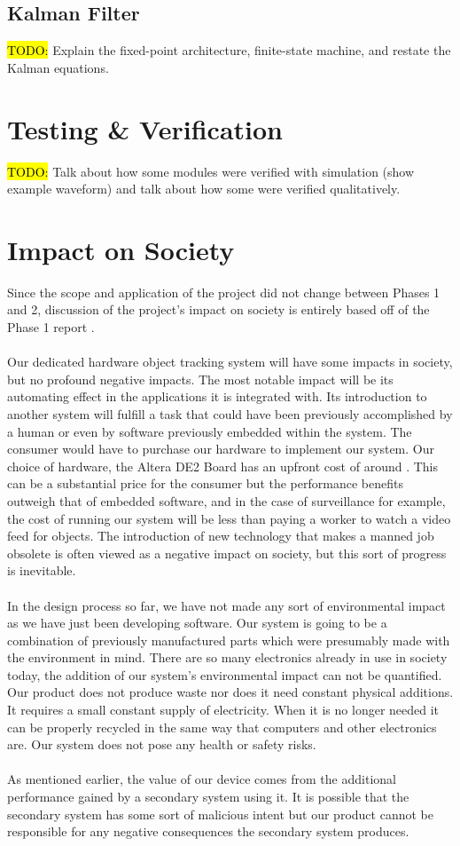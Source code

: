 \documentclass[11pt]{article} %
\begin{document}
\subsection{Kalman Filter}
\hl{TODO:} Explain the fixed-point architecture, finite-state machine, and restate the Kalman equations.
\section{Testing \& Verification}
\hl{TODO:} Talk about how some modules were verified with simulation (show example waveform) and talk about how some were verified qualitatively.
\section{Impact on Society}
Since the scope and application of the project did not change between Phases 1 and 2, discussion of the project's impact on society is entirely based off of the Phase 1 report \cite{phase1}. \\\\
Our dedicated hardware object tracking system will have some impacts in society, but no profound negative impacts. The most notable impact will be its automating effect in the applications it is integrated with. Its introduction to another system will fulfill a task that could have been previously accomplished by a human or even by software previously embedded within the system. The consumer would have to purchase our hardware to implement our system. Our choice of hardware, the Altera DE2 Board has an upfront cost of around . This can be a substantial price for the consumer but the performance benefits outweigh that of embedded software, and in the case of surveillance for example, the cost of running our system will be less than paying a worker to watch a video feed for objects. The introduction of new technology that makes a manned job obsolete is often viewed as a negative impact on society, but this sort of progress is inevitable. \\\\
In the design process so far, we have not made any sort of environmental impact as we have just been developing software. Our system is going to be a combination of previously manufactured parts which were presumably made with the environment in mind. There are so many electronics already in use in society today, the addition of our system's environmental impact can not be quantified. Our product does not produce waste nor does it need constant physical additions. It requires a small constant supply of electricity. When it is no longer needed it can be properly recycled in the same way that computers and other electronics are. Our system does not pose any health or safety risks.\\\\
As mentioned earlier, the value of our device comes from the additional performance gained by a secondary system using it. It is possible that the secondary system has some sort of malicious intent but our product cannot be responsible for any negative consequences the secondary system produces. 
\end{document}
